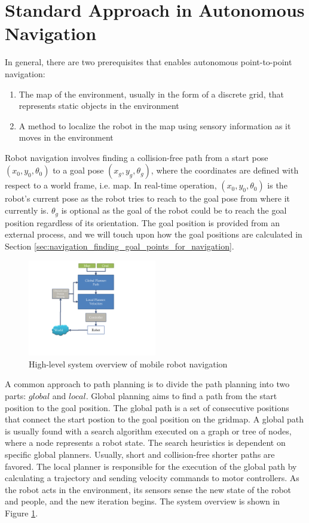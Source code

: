 \section{Standard Approach in Autonomous Navigation}
\label{sec:navigation_contemporary_navigation_practices}

In general, there are two prerequisites that enables autonomous point-to-point navigation: 

\begin{enumerate}
\item The map of the environment, usually in the form of a discrete grid, that represents static objects in the environment
\item A method to localize the robot in the map using sensory information as it moves in the environment
\end{enumerate}

Robot navigation involves finding a collision-free path from a start pose $(x_{0},y_{0},\theta_0)$ to a goal pose $(x_{g},y_{g},\theta_g)$, where the coordinates are defined with respect to a world frame, i.e. map. In real-time operation, $(x_{0},y_{0}, \theta_0)$ is the robot's current pose as the robot tries to reach to the goal pose from where it currently is. $\theta_g$ is optional as the goal of the robot could be to reach the goal position regardless of its orientation. The goal position is provided from an external process, and we will touch upon how the goal positions are calculated in Section \ref{sec:navigation_finding_goal_points_for_navigation}.


\begin{figure}[ht!]
\centering
\includegraphics[width=0.5\textwidth]{pics/navigation_overview}
\caption{High-level system overview of mobile robot navigation}
\label{fig:navigation_overview}
\end{figure}

A common approach to path planning is to divide the path planning into two parts: $global$ and $local$. Global planning aims to find a path from the start position to the goal position. The global path is a set of consecutive positions that connect the start postion to the goal position on the gridmap. A global path is usually found with a search algorithm executed on a graph or tree of nodes, where a node represents a robot state. The search heuristics is dependent on specific global planners. Usually, short and collision-free shorter paths are favored. The local planner is responsible for the execution of the global path by calculating a trajectory and sending velocity commands to motor controllers. As the robot acts in the environment, its sensors sense the new state of the robot and people, and the new iteration begins. The system overview is shown in Figure \ref{fig:navigation_overview}.

